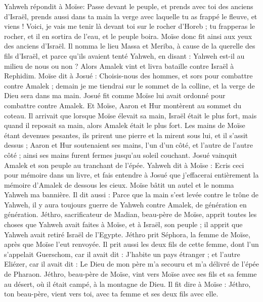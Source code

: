 \begin{multicols}{2}
Yahweh répondit à Moïse: Passe devant le peuple, et prends avec toi des anciens d'Israël, prends aussi dans ta main la verge avec laquelle tu as frappé le fleuve, et viens !
Voici, je vais me tenir là devant toi sur le rocher d’Horeb ; tu frapperas le rocher, et il en sortira de l’eau, et le peuple boira. Moïse donc fit ainsi aux yeux des anciens d'Israël.
Il nomma le lieu Massa et Meriba, à cause de la querelle des fils d'Israël, et parce qu'ils avaient tenté Yahweh, en disant : Yahweh est-il au milieu de nous ou non ?
Alors Amalek vint et livra bataille contre Israël à Rephidim.
Moïse dit à Josué : Choisis-nous des hommes, et sors pour combattre contre Amalek ; demain je me tiendrai sur le sommet de la colline, et la verge de Dieu sera dans ma main.
Josué fit comme Moïse lui avait ordonné pour combattre contre Amalek. Et Moïse, Aaron et Hur montèrent au sommet du coteau.
Il arrivait que lorsque Moïse élevait sa main, Israël était le plus fort, mais quand il reposait sa main, alors Amalek était le plus fort.
Les mains de Moïse étant devenues pesantes, ils prirent une pierre et la mirent sous lui, et il s'assit dessus ; Aaron et Hur soutenaient ses mains, l'un d’un côté, et l'autre de l’autre côté ; ainsi ses mains furent fermes jusqu'au soleil couchant.
Josué vainquit Amalek et son peuple au tranchant de l'épée.
Yahweh dit à Moïse : Ecris ceci pour mémoire dans un livre, et fais entendre à Josué que j'effacerai entièrement la mémoire d'Amalek de dessous les cieux.
Moïse bâtit un autel et le nomma Yahweh ma bannière.
Il dit aussi : Parce que la main s’est levée contre le trône de Yahweh, il y aura toujours guerre de Yahweh contre Amalek, de génération en génération.
\VerseOne{}Jéthro, sacrificateur de Madian, beau-père de Moïse, apprit toutes les choses que Yahweh avait faites à Moïse, et à Israël, son peuple ; il apprit que Yahweh avait retiré Israël de l'Egypte.
Jéthro prit Séphora, la femme de Moïse, après que Moïse l'eut renvoyée.
Il prit aussi les deux fils de cette femme, dont l'un s'appelait Guerschom, car il avait dit : J’habite un pays étranger ;
et l'autre Eliézer, car il avait dit : Le Dieu de mon père m'a secouru et m'a délivré de l'épée de Pharaon.
Jéthro, beau-père de Moïse, vint vers Moïse avec ses fils et sa femme au désert, où il était campé, à la montagne de Dieu.
Il fit dire à Moïse : Jéthro, ton beau-père, vient vers toi, avec ta femme et ses deux fils avec elle.

\end{multicols}
